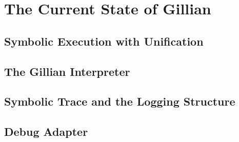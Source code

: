 
\chapter{The Current State of Gillian}\label{sec:current}

\section{Symbolic Execution with Unification}\label{sec:current:symex}

\section{The Gillian Interpreter}\label{sec:current:interpreter}

\section{Symbolic Trace and the Logging Structure}\label{sec:current:trace}

\section{Debug Adapter}\label{sec:current:dap}
